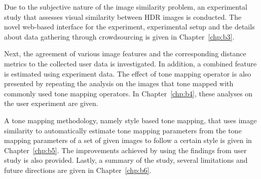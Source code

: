 Due to the subjective nature of the image similarity problem, an experimental study that assesses visual similarity between HDR images is conducted. The novel web-based interface for the experiment, experimental setup and the details about data gathering through crowdsourcing is given in Chapter~\ref{chp:b3}.

Next, the agreement of various image features and the corresponding distance metrics to the collected user data is investigated. In addition, a combined feature is estimated using experiment data. The effect of tone mapping operator is also presented by repeating the analysis on the images that tone mapped with commonly used tone mapping operators. In Chapter~\ref{chp:b4}, these analyses on the user experiment are given.

A tone mapping methodology, namely style based tone mapping, that uses image similarity to automatically estimate tone mapping parameters from the tone mapping parameters of a set of given images to follow a certain style is given in Chapter~\ref{chp:b5}. The improvements achieved by using the findings from user study is also provided.
Lastly, a summary of the study, several limitations and future directions are given in Chapter~\ref{chp:b6}.






